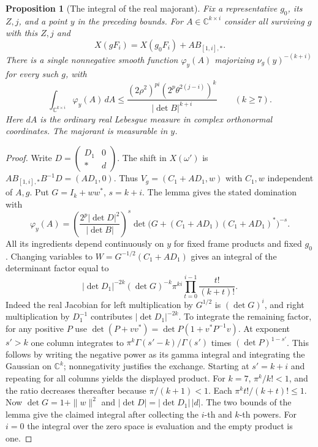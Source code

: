 \documentclass[a4paper,11pt]{article}
\newtheorem{proposition}{Proposition}[section]
\theoremstyle{definition}
\theoremstyle{remark}
\numberwithin{equation}{section}
\begin{document}
\begin{proposition}[The integral of the real majorant]\leavevmode
\label{prop:schurreal692}
Fix a representative \(g_0\), its \(Z,j\), and a point \(y\)
in the preceding bounds. For \(A\in\mathbb C^{k\times i}\)
consider all surviving \(g\) with this \(Z,j\) and
\[
          X(gF_i)=X(g_0F_i)+A B_{[1,i],*}.
\]
There is a single nonnegative smooth function \(\varphi_y(A)\)
majorizing \(\nu_g(y)^{-(k+i)}\) for every such \(g\), with
\[
 \int_{\mathbb C^{k\times i}}\varphi_y(A)\,dA
   \le \frac{(2\rho^2)^{pi}(2^p\theta^{2(j-i)})^k}
                 {|\det B|^{k+i}}\qquad(k\ge7).
\]
Here \(dA\) is the ordinary real Lebesgue measure in complex
orthonormal coordinates. The majorant is measurable in \(y\).
\end{proposition}
\begin{proof}
Write \(D=\left(\begin{smallmatrix}D_1&0\\ *&d\end{smallmatrix}\right)\).
The shift in \(X(\omega')\) is \(A B_{[1,i],*}B^{-1}D
=(AD_1,0)\). Thus \(V_g=(C_1+AD_1,w)\) with \(C_1,w\)
independent of \(A,g\). Put \(G=I_k+ww^*\), \(s=k+i\).
The lemma gives the stated domination with
\[
 \varphi_y(A)=
 \left(\frac{2^p|\det D|^2}{|\det B|}\right)^s
 \det\!\bigl(G+(C_1+AD_1)(C_1+AD_1)^*\bigr)^{-s}.
\]
All its ingredients depend continuously on \(y\) for fixed
frame products and fixed \(g_0\).
Changing variables to \(W=G^{-1/2}(C_1+AD_1)\) gives an
integral of the determinant factor equal to
\[
      |\det D_1|^{-2k}(\det G)^{-k}
           \pi^{ki}\prod_{t=0}^{i-1}\frac{t!}{(k+t)!}.
\]
Indeed the real Jacobian for left multiplication by \(G^{1/2}\)
is \((\det G)^i\), and right multiplication by \(D_1^{-1}\)
contributes \(|\det D_1|^{-2k}\). To integrate the remaining
factor, for any positive \(P\) use
\(\det(P+vv^*)=\det P(1+v^*P^{-1}v)\). At exponent \(s'>k\)
one column integrates to \(\pi^k\Gamma(s'-k)/\Gamma(s')\)
times \((\det P)^{1-s'}\). This follows by writing the
negative power as its gamma integral and integrating the
Gaussian on \(\mathbb C^k\); nonnegativity justifies the
exchange. Starting at \(s'=k+i\) and repeating for all
columns yields the displayed product. For \(k=7\),
\(\pi^k/k!<1\), and the ratio decreases thereafter because
\(\pi/(k+1)<1\). Each \(\pi^k t!/(k+t)!\le1\).
Now \(\det G=1+\|w\|^2\) and
\(|\det D|=|\det D_1|\,|d|\). The two bounds of the lemma
give the claimed integral after collecting the \(i\)-th and
\(k\)-th powers. For \(i=0\) the integral over the zero space
is evaluation and the empty product is one.
\end{proof}
\end{document}
